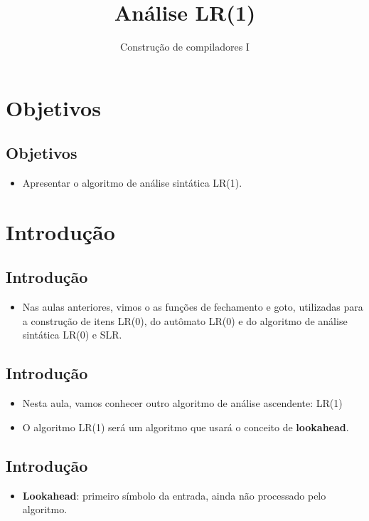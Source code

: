 \documentclass[11pt]{article}
\author{Construção de compiladores I}
\date{}
\title{Análise LR(1)}
\begin{document}
\maketitle
\section*{Objetivos}
\label{sec:org82033a6}

\subsection*{Objetivos}
\label{sec:orge8c2a2a}

\begin{itemize}
\item Apresentar o algoritmo de análise sintática LR(1).
\end{itemize}
\section*{Introdução}
\label{sec:orgc3503d1}

\subsection*{Introdução}
\label{sec:orgc1b70f3}

\begin{itemize}
\item Nas aulas anteriores, vimos o as funções de fechamento e goto,
utilizadas para a construção de itens LR(0), do autômato LR(0)
e do algoritmo de análise sintática LR(0) e SLR.
\end{itemize}
\subsection*{Introdução}
\label{sec:org561468a}

\begin{itemize}
\item Nesta aula, vamos conhecer outro algoritmo de análise
ascendente: LR(1)

\item O algoritmo LR(1) será um algoritmo que usará o conceito de \textbf{lookahead}.
\end{itemize}
\subsection*{Introdução}
\label{sec:orgaafc30e}

\begin{itemize}
\item \textbf{Lookahead}: primeiro símbolo da entrada, ainda não processado pelo algoritmo.
\end{itemize}
\end{document}

